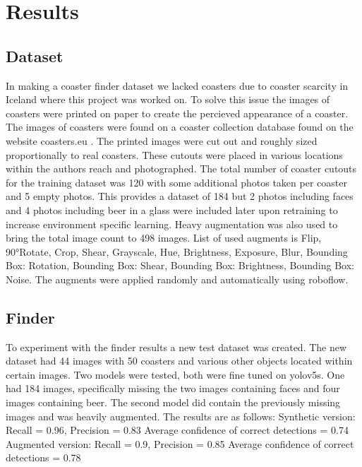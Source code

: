 \documentclass{article}
\begin{document}
\section{Results}
\subsection{Dataset}
In making a coaster finder dataset we lacked coasters due to coaster scarcity in Iceland where this project was worked on.
To solve this issue the images of coasters were printed on paper to create the percieved appearance of a coaster. The images of coasters
were found on a coaster collection database found on the website coasters.eu \cite{}. The printed images were cut out and roughly sized proportionally to real coasters. 
These cutouts were placed in various locations within the authors reach and photographed. The total number of coaster cutouts for the 
training dataset was 120 with some additional photos taken per coaster and 5 empty photos. This provides a dataset of 184 but 2 photos
including faces and 4 photos including beer in a glass were included later upon retraining to increase environment specific learning.
Heavy augmentation was also used to bring the total image count to 498 images. List of used augments is Flip, 90°Rotate, Crop, Shear, Grayscale, Hue, Brightness, Exposure, Blur,
Bounding Box: Rotation, Bounding Box: Shear, Bounding Box: Brightness, Bounding Box: Noise. The augments were applied randomly and automatically using roboflow.

\subsection{Finder}

To experiment with the finder results a new test dataset was created. The new dataset had 44 images with 50 coasters and various other objects located
within certain images. Two models were tested, both were fine tuned on yolov5s. One had 184 images, specifically missing the two images containing faces and four images containing beer.
The second model did contain the previously missing images and was heavily augmented. The results are as follows: 
Synthetic version:
    Recall = 0.96, Precision = 0.83
    Average confidence of correct detections = 0.74
Augmented version:
    Recall = 0.9, Precision = 0.85
    Average confidence of correct detections = 0.78
\end{document}

